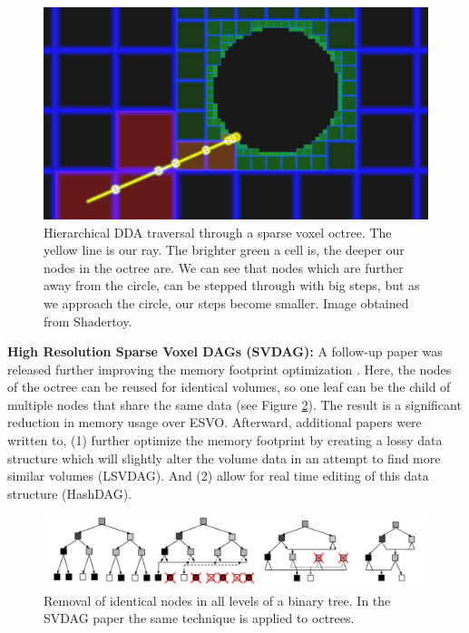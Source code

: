 \begin{figure}[H]
    \centering
    \includegraphics[width=0.9\linewidth]{figures/esvo_traversal.png}
    \caption{Hierarchical DDA traversal through a sparse voxel octree. The yellow line is our ray. The brighter green a cell is, the deeper our nodes in the octree are. We can see that nodes which are further away from the circle, can be stepped through with big steps, but as we approach the circle, our steps become smaller. Image obtained from Shadertoy.}
    \label{fig:esvo}
\end{figure}

\noindent\textbf{High Resolution Sparse Voxel DAGs (SVDAG):} A follow-up paper was released further improving the memory footprint optimization \cite{kampe2013high}. Here, the nodes of the octree can be reused for identical volumes, so one leaf can be the child of multiple nodes that share the same data (see Figure \ref{fig:DAG_node_deduplication}). The result is a significant reduction in memory usage over ESVO. Afterward, additional papers were written to, (1) further optimize the memory footprint by creating a lossy data structure which will slightly alter the volume data in an attempt to find more similar volumes \cite{van2020lossy} (LSVDAG). And (2) allow for real time editing of this data structure \cite{careil2020interactively} (HashDAG). 

\begin{figure}[H]
    \centering
    \includegraphics[width=0.9\linewidth]{figures/DAG_node_deduplication.png}
    \caption{Removal of identical nodes in all levels of a binary tree. In the SVDAG paper the same technique is applied to octrees. \cite{kampe2013high}}
    \label{fig:DAG_node_deduplication}
\end{figure}

